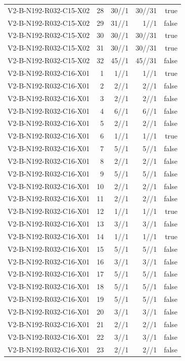 {\begin{longtable}{lrrrr}
V2-B-N192-R032-C15-X02 & 28 & 30//1 & 30//31 & true \\
V2-B-N192-R032-C15-X02 & 29 & 31//1 & 1//1 & false \\
V2-B-N192-R032-C15-X02 & 30 & 30//1 & 30//31 & true \\
V2-B-N192-R032-C15-X02 & 31 & 30//1 & 30//31 & true \\
V2-B-N192-R032-C15-X02 & 32 & 45//1 & 45//31 & false \\
V2-B-N192-R032-C16-X01 & 1 & 1//1 & 1//1 & true \\
V2-B-N192-R032-C16-X01 & 2 & 2//1 & 2//1 & false \\
V2-B-N192-R032-C16-X01 & 3 & 2//1 & 2//1 & false \\
V2-B-N192-R032-C16-X01 & 4 & 6//1 & 6//1 & false \\
V2-B-N192-R032-C16-X01 & 5 & 2//1 & 2//1 & false \\
V2-B-N192-R032-C16-X01 & 6 & 1//1 & 1//1 & true \\
V2-B-N192-R032-C16-X01 & 7 & 5//1 & 5//1 & false \\
V2-B-N192-R032-C16-X01 & 8 & 2//1 & 2//1 & false \\
V2-B-N192-R032-C16-X01 & 9 & 5//1 & 5//1 & false \\
V2-B-N192-R032-C16-X01 & 10 & 2//1 & 2//1 & false \\
V2-B-N192-R032-C16-X01 & 11 & 2//1 & 2//1 & false \\
V2-B-N192-R032-C16-X01 & 12 & 1//1 & 1//1 & true \\
V2-B-N192-R032-C16-X01 & 13 & 3//1 & 3//1 & false \\
V2-B-N192-R032-C16-X01 & 14 & 1//1 & 1//1 & true \\
V2-B-N192-R032-C16-X01 & 15 & 5//1 & 5//1 & false \\
V2-B-N192-R032-C16-X01 & 16 & 3//1 & 3//1 & false \\
V2-B-N192-R032-C16-X01 & 17 & 5//1 & 5//1 & false \\
V2-B-N192-R032-C16-X01 & 18 & 5//1 & 5//1 & false \\
V2-B-N192-R032-C16-X01 & 19 & 5//1 & 5//1 & false \\
V2-B-N192-R032-C16-X01 & 20 & 3//1 & 3//1 & false \\
V2-B-N192-R032-C16-X01 & 21 & 2//1 & 2//1 & false \\
V2-B-N192-R032-C16-X01 & 22 & 3//1 & 3//1 & false \\
V2-B-N192-R032-C16-X01 & 23 & 2//1 & 2//1 & false \\

\end{longtable}}
